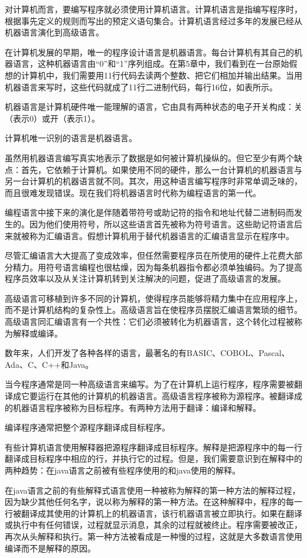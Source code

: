 对计算机而言，要编写程序就必须使用计算机语言。计算机语言是指编写程序时，根据事先定义的规则而写出的预定义语句集合。计算机语言经过多年的发展已经从机器语言演化到高级语言。

在计算机发展的早期，唯一的程序设计语言是机器语言。每台计算机有其自己的机器语言，这种机器语言由“0”和“1”序列组成。在第5章中，我们看到在一台原始假想的计算机中，我们需要用11行代码去读两个整数、把它们相加并输出结果。当用机器语言来写时，这些代码就成了11行二进制代码，每行16位，如表所示。

机器语言是计算机硬件唯一能理解的语言，它由具有两种状态的电子开关构成：关（表示0）或开（表示1）。

计算机唯一识别的语言是机器语言。

虽然用机器语言编写真实地表示了数据是如何被计算机操纵的。但它至少有两个缺点：首先，它依赖于计算机。如果使用不同的硬件，那么一台计算机的机器语言与另一台计算机的机器语言就不同。其次，用这种语言编写程序时非常单调乏味的，而且很难发现错误。现在我们将机器语言时代称为编程语言的第一代。

编程语言中接下来的演化是伴随着带符号或助记符的指令和地址代替二进制码而发生的。因为他们使用符号，所以这些语言首先被称为符号语言。这些助记符语言后来就被称为汇编语言。假想计算机用于替代机器语言的汇编语言显示在程序中。

尽管汇编语言大大提高了变成效率，但任然需要程序员在所使用的硬件上花费大部分精力。用符号语言编程也很枯燥，因为每条机器指令都必须单独编码。为了提高程序员效率以及从关注计算机转到关注解决的问题，促进了高级语言的发展。

高级语言可移植到许多不同的计算机，使得程序员能够将精力集中在应用程序上，而不是计算机结构的复杂性上。高级语言旨在使程序员摆脱汇编语言繁琐的细节。高级语言同汇编语言有一个共性：它们必须被转化为机器语言，这个转化过程被称为解释或编译。

数年来，人们开发了各种各样的语言，最著名的有BASIC、COBOL、Pascal、Ada、C、C++和Java。

当今程序通常是同一种高级语言来编写。为了在计算机上运行程序，程序需要被翻译成它要运行在其他的计算机的机器语言。高级语言程序被称为源程序。被翻译成的机器语言程序被称为目标程序。有两种方法用于翻译：编译和解释。

编译程序通常把整个源程序翻译成目标程序。

有些计算机语言使用解释器把源程序翻译成目标程序。解释是把源程序中的每一行翻译成目标程序中相应的行，并执行它的过程。但是，我们需要意识到在解释中的两种趋势：在java语言之前被有些程序使用的和java使用的解释。

在java语言之前的有些解释式语言使用一种被称为解释的第一种方法的解释过程，因为缺少其他任何名字，说以称为解释的第一种方法。在这种解释中，程序的每一行被翻译成其使用的计算机上的机器语言，该行机器语言被立即执行。如果在翻译或执行中有任何错误，过程就显示消息，其余的过程就被终止。程序需要被改正，再次从头解释和执行。第一种方法被看成是一种慢的过程，这就是大多数语言使用编译而不是解释的原因。

